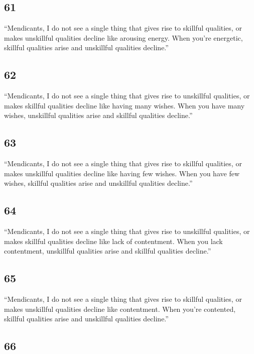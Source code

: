 \documentclass[12pt,openany]{book}%
\begin{document}
\subsection*{61 }

“Mendicants, I do not see a single thing that gives rise to skillful qualities, or makes unskillful qualities decline like arousing energy. When you’re energetic, skillful qualities arise and unskillful qualities decline.” 

\subsection*{62 }

“Mendicants, I do not see a single thing that gives rise to unskillful qualities, or makes skillful qualities decline like having many wishes. When you have many wishes, unskillful qualities arise and skillful qualities decline.” 

\subsection*{63 }

“Mendicants, I do not see a single thing that gives rise to skillful qualities, or makes unskillful qualities decline like having few wishes. When you have few wishes, skillful qualities arise and unskillful qualities decline.” 

\subsection*{64 }

“Mendicants, I do not see a single thing that gives rise to unskillful qualities, or makes skillful qualities decline like lack of contentment. When you lack contentment, unskillful qualities arise and skillful qualities decline.” 

\subsection*{65 }

“Mendicants, I do not see a single thing that gives rise to skillful qualities, or makes unskillful qualities decline like contentment. When you’re contented, skillful qualities arise and unskillful qualities decline.” 

\subsection*{66 }
\end{document}

